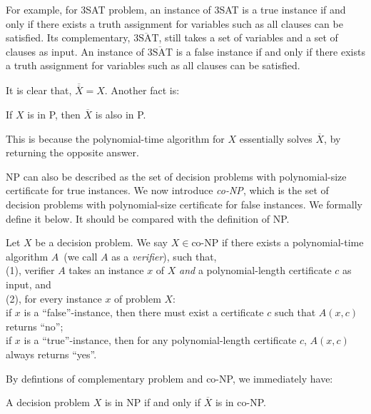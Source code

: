 For example, for 3SAT problem, an instance of 3SAT is a true instance if and only 
if there exists a truth assignment for variables such as all clauses can be satisfied.
Its complementary, $\overline{\textrm{3SAT}}$, still takes a set of variables and a set of clauses
as input. An instance of $\overline{\textrm{3SAT}}$ is a false instance if and only if
there exists a truth assignment for variables such as all clauses can be satisfied.

It is clear that, $\overline{\overline{X}} = X$. Another fact is: 
\begin{fact}
If $X$ is in P, then $\overline{X}$ is also in P. 
\label{fac:np1}
\end{fact}
This is because the polynomial-time algorithm
for $X$ essentially solves $\overline{X}$, by returning the opposite answer.

NP can also be described as the set of decision problems
with polynomial-size certificate for true instances.
We now introduce \emph{co-NP}, which is the set of decision problems
with polynomial-size certificate for false instances.
We formally define it below. It should be compared with the definition of NP.


\begin{definition}[co-NP]
Let $X$ be a decision problem. We say $X\in \textrm{co-NP}$ if there exists a polynomial-time algorithm $A$~(we call $A$ as a \emph{verifier}), such that,\\
        (1), verifier $A$ takes an instance $x$ of $X$ \emph{and} a polynomial-length certificate $c$ as input, and \\
        (2), for every instance $x$ of problem $X$: \\
        \hspace*{0.2cm} if $x$ is a ``false''-instance, then there must exist a certificate $c$ such that $A(x,c)$ returns ``no'';\\
        \hspace*{0.2cm} if $x$ is a ``true''-instance, then for any polynomial-length certificate $c$, $A(x,c)$ always returns ``yes''.
\end{definition}

By defintions of complementary problem and co-NP, we immediately have:
\begin{fact}
A decision problem $X$ is in NP if and only if $\overline{X}$ is in co-NP.
\label{fac:np2}
\end{fact}

